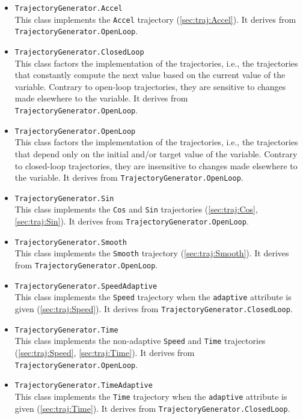 \begin{itemize}
\item \lstinline|TrajectoryGenerator.Accel|~\\
  This class implements the \lstinline|Accel| trajectory
  (\autoref{sec:traj:Accel}).  It derives from
  \lstinline|TrajectoryGenerator.OpenLoop|.

\item \lstinline|TrajectoryGenerator.ClosedLoop|~\\
  This class factors the implementation of the 
  trajectories, i.e., the trajectories that constantly compute the
  next value based on the current value of the variable.  Contrary to
  open-loop trajectories, they are sensitive to changes made elsewhere
  to the variable.  It derives from
  \lstinline|TrajectoryGenerator.OpenLoop|.

\item \lstinline|TrajectoryGenerator.OpenLoop|~\\
  This class factors the implementation of the 
  trajectories, i.e., the trajectories that depend only on the initial
  and/or target value of the variable.  Contrary to closed-loop
  trajectories, they are insensitive to changes made elsewhere to the
  variable.  It derives from \lstinline|TrajectoryGenerator.OpenLoop|.

\item \lstinline|TrajectoryGenerator.Sin|~\\
  This class implements the \lstinline|Cos| and \lstinline|Sin|
  trajectories (\autoref{sec:traj:Cos}, \autoref{sec:traj:Sin}).  It
  derives from \lstinline|TrajectoryGenerator.OpenLoop|.

\item \lstinline|TrajectoryGenerator.Smooth|~\\
  This class implements the \lstinline|Smooth| trajectory
  (\autoref{sec:traj:Smooth}).  It derives from
  \lstinline|TrajectoryGenerator.OpenLoop|.

\item \lstinline|TrajectoryGenerator.SpeedAdaptive|~\\
  This class implements the \lstinline|Speed| trajectory when the
  \lstinline|adaptive| attribute is given (\autoref{sec:traj:Speed}).
  It derives from \lstinline|TrajectoryGenerator.ClosedLoop|.

\item \lstinline|TrajectoryGenerator.Time|~\\
  This class implements the non-adaptive \lstinline|Speed| and
  \lstinline|Time| trajectories (\autoref{sec:traj:Speed},
  \autoref{sec:traj:Time}).  It derives from
  \lstinline|TrajectoryGenerator.OpenLoop|.

\item \lstinline|TrajectoryGenerator.TimeAdaptive|~\\
  This class implements the \lstinline|Time| trajectory when the
  \lstinline|adaptive| attribute is given (\autoref{sec:traj:Time}).
  It derives from \lstinline|TrajectoryGenerator.ClosedLoop|.
\end{itemize}

